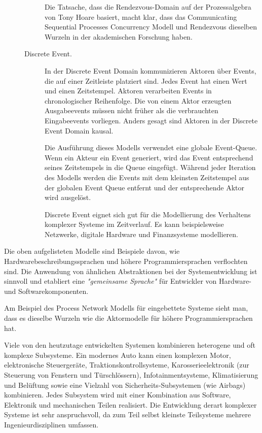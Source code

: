 \begin{description}
\begin{description}
		Die Tatsache, dass die Rendezvous-Domain auf der Prozessalgebra von Tony Hoare basiert, macht klar, dass das Communicating Sequential Processes Concurrency Modell und Rendezvous dieselben Wurzeln in der akademischen Forschung haben.
		
		\item[Discrete Event.] In der Discrete Event Domain kommunizieren Aktoren über Events, die auf einer Zeitleiste platziert sind. Jedes Event hat einen Wert und einen Zeitstempel. Aktoren verarbeiten Events in chronologischer Reihenfolge. Die von einem Aktor erzeugten Ausgabeevents müssen nicht früher als die verbrauchten Eingabeevents vorliegen. Anders gesagt sind Aktoren in der Discrete Event Domain kausal.
		
		Die Ausführung dieses Modells verwendet eine globale Event-Queue. Wenn ein Akteur ein Event generiert, wird das Event entsprechend seines Zeitstempels in die Queue eingefügt. Während jeder Iteration des Modells werden die Events mit dem kleinsten Zeitstempel aus der globalen Event Queue entfernt und der entsprechende Aktor wird ausgelöst.
		
		Discrete Event eignet sich gut für die Modellierung des Verhaltens komplexer Systeme im Zeitverlauf. Es kann beispielsweise Netzwerke, digitale Hardware und Finanzsysteme modellieren.
	\end{description}
\end{description}

Die oben aufgelisteten Modelle sind Beispiele davon, wie Hardwarebeschreibungssprachen und höhere Programmiersprachen verflochten sind. Die Anwendung von ähnlichen Abstraktionen bei der Systementwicklung ist sinnvoll und etabliert eine \textit{"gemeinsame Sprache"} für Entwickler von Hardware- und Softwarekomponenten.

Am Beispiel des Process Network Modells für eingebettete Systeme sieht man, dass es dieselbe Wurzeln wie die Aktormodelle für höhere Programmiersprachen hat.

Viele von den heutzutage entwickelten Systemen kombinieren heterogene und oft komplexe Subsysteme. Ein modernes Auto kann einen komplexen Motor, elektronische Steuergeräte, Traktionskontrollsysteme, Karosserieelektronik (zur Steuerung von Fenstern und Türschlössern), Infotainmentsysteme, Klimatisierung und Belüftung sowie eine Vielzahl von Sicherheits-Subsystemen (wie Airbags) kombinieren. Jedes Subsystem wird mit einer Kombination aus Software, Elektronik und mechanischen Teilen realisiert. Die Entwicklung derart komplexer Systeme ist sehr anspruchsvoll, da zum Teil selbst kleinste Teilsysteme mehrere Ingenieurdisziplinen umfassen.

